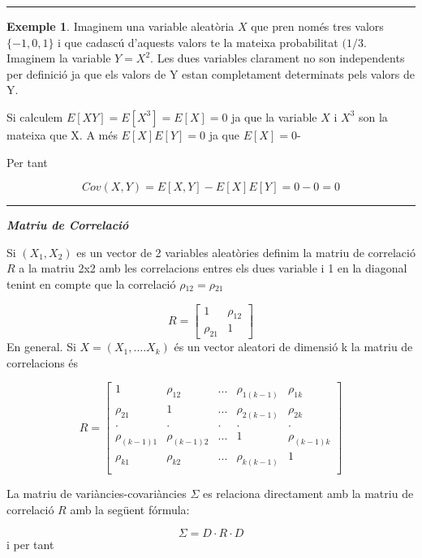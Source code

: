 \documentclass[
  catalan,
]{article}
\theoremstyle{definition}
\theoremstyle{definition}
\newtheorem{example}{Exemple}[section]
\theoremstyle{definition}
\theoremstyle{definition}
\theoremstyle{remark}
\begin{document}
\begin{center}\rule{0.5\linewidth}{0.5pt}\end{center}

\begin{example}
Imaginem una variable aleatòria \(X\) que pren només tres valors \(\{-1,0,1\}\) i que cadascú d'aquests valors te la mateixa probabilitat \((1/3\). Imaginem la variable \(Y=X^2\). Les dues variables clarament no son independents per definició ja que els valors de Y estan completament determinats pels valors de Y.

Si calculem \(E[XY]=E[X^3]=E[X]=0\) ja que la variable \(X\) i \(X^3\) son la mateixa que X. A més \(E[X]E[Y]=0\) ja que \(E[X]=0\)-

Per tant

\[
 Cov(X,Y)=E[X,Y] -E[X]E[Y]=0-0=0
 \]
\end{example}

\begin{center}\rule{0.5\linewidth}{0.5pt}\end{center}

\textbf{\emph{Matriu de Correlació}}

Si \((X_1, X_2)\) es un vector de 2 variables aleatòries definim la matriu de correlació \(R\) a la matriu 2x2 amb les correlacions entres els dues variable i 1 en la diagonal tenint en compte que la correlació \(\rho{_12}=\rho{_21}\)

\[
R= \begin{bmatrix} 1 &  \rho_{12}  \\ \rho_{21} & 1  \end{bmatrix} 
\]
En general. Si \(X=(X_1,....X_k)\) és un vector aleatori de dimensió k la matriu de correlacions és

\[
R=
\begin{bmatrix} 
1 & \rho_{12} & ... & \rho_{1(k-1)}  & \rho_{1k} \\
\rho_{21}  & 1 & ... & \rho_{2(k-1)}  & \rho_{2k} \\  
.  & . & . & .  & . \\  
\rho_{(k-1)1}  & \rho_{(k-1)2} & ... & 1  & \rho_{(k-1)k} \\  
\rho_{k1}  & \rho_{k2} & ... &  \rho_{k(k-1)}  & 1\\  
\end{bmatrix} 
\]

La matriu de variàncies-covariàncies \(\Sigma\) es relaciona directament amb la matriu de correlació \(R\) amb la següent fórmula:

\[
\Sigma= D·R·D
\]
i per tant
\end{document}
